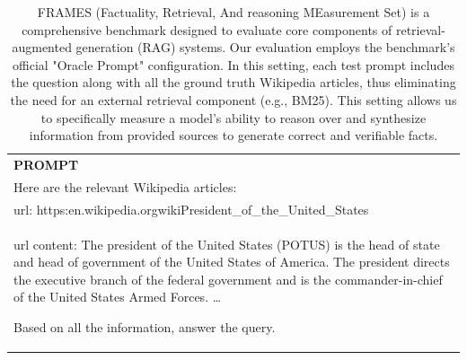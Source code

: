 \begin{table}[h]
    \centering \small
        \caption{FRAMES (Factuality, Retrieval, And reasoning MEasurement Set) is a comprehensive benchmark designed to evaluate core components of retrieval-augmented generation (RAG) systems. Our evaluation employs the benchmark's official "Oracle Prompt" configuration. In this setting, each test prompt includes the question along with all the ground truth Wikipedia articles, thus eliminating the need for an external retrieval component (e.g., BM25). This setting allows us to specifically measure a model's ability to reason over and synthesize information from provided sources to generate correct and verifiable facts. }
    \label{tab:frames_eval_format_example}
    \begin{tabular}{p{}}
    \hline
    \textbf{PROMPT}\\
    Here are the relevant Wikipedia articles: \\
url: https:\/\/en.wikipedia.org\/wiki\/President\_of\_the\_United\_States \\
url content: The president of the United States (POTUS) is the head of state and head of government of the United States of America. The president directs the executive branch of the federal government and is the commander-in-chief of the United States Armed Forces.
\ldots

Based on all the information, answer the query. 


\end{tabular}
\end{table}
